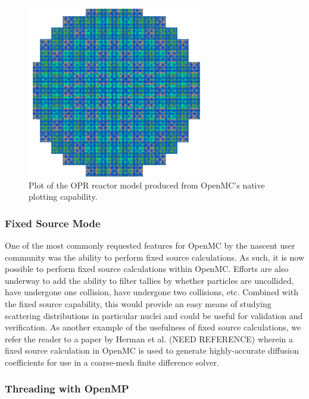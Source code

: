 \documentclass{ansconf}
\begin{document}
\begin{figure}[!htb]
  \centering \includegraphics[width=3in]{opr.png}
  \caption{Plot of the OPR reactor model produced from OpenMC's native plotting
    capability.}
  \label{fig:plotting}
\end{figure}


\subsubsection{Fixed Source Mode}

One of the most commonly requested features for OpenMC by the nascent user
community was the ability to perform fixed source calculations. As such, it is
now possible to perform fixed source calculations within OpenMC. Efforts are
also underway to add the ability to filter tallies by whether particles are
uncollided, have undergone one collision, have undergone two collisions,
etc. Combined with the fixed source capability, this would provide an easy means
of studying scattering distributions in particular nuclei and could be useful
for validation and verification. As another example of the usefulness of fixed
source calculations, we refer the reader to a paper by Herman et al. (NEED
REFERENCE) wherein a fixed source calculation in OpenMC is used to generate
highly-accurate diffusion coefficients for use in a coarse-mesh finite
difference solver.

\subsubsection{Threading with OpenMP}
\end{document}
